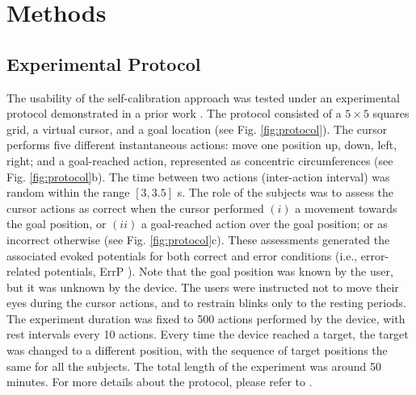 
\section{Methods}
\label{sec:methods}

\subsection{Experimental Protocol}

The usability of the self-calibration approach was tested under an experimental protocol demonstrated in a prior work \cite{iturrate13}. The protocol consisted of a $5\times5$ squares grid, a virtual cursor, and a goal location (see Fig. \ref{fig:protocol}). The cursor performs five different instantaneous actions: move one position up, down, left, right; and a goal-reached action, represented as concentric circumferences (see Fig. \ref{fig:protocol}b). The time between two actions (inter-action interval) was random within the range $[3, 3.5]$ s. The role of the subjects was to assess the cursor actions as correct when the cursor performed $(i)$ a movement towards the goal position, or $(ii)$ a goal-reached action over the goal position; or as incorrect otherwise (see Fig. \ref{fig:protocol}c). These assessments generated the associated evoked potentials for both correct and error conditions (i.e., error-related potentials, ErrP \cite{chavarriaga2014errare}). Note that the goal position was known by the user, but it was unknown by the device. The users were instructed not to move their eyes during the cursor actions, and to restrain blinks only to the resting periods. The experiment duration was fixed to 500 actions performed by the device, with rest intervals every 10 actions. Every time the device reached a target, the target was changed to a different position, with the sequence of target positions the same for all the subjects. The total length of the experiment was around 50 minutes. For more details about the protocol, please refer to \cite{iturrate13}.

